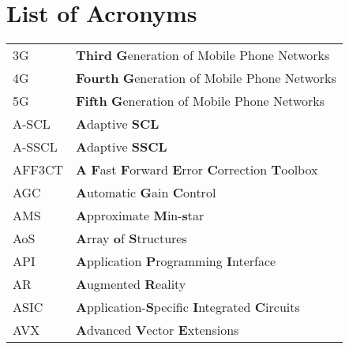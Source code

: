 
\chapter*{List of Acronyms}

\begin{center}
	\begin{longtable}{ p{}  p{} }
		3G      & \textbf{Third} \textbf{G}eneration of Mobile Phone Networks                                                     \\
		4G      & \textbf{Fourth} \textbf{G}eneration of Mobile Phone Networks                                                    \\
		5G      & \textbf{Fifth} \textbf{G}eneration of Mobile Phone Networks                                                     \\
		A-SCL   & \textbf{A}daptive \textbf{SCL}                                                                                  \\
		A-SSCL  & \textbf{A}daptive \textbf{SSCL}                                                                                 \\
		AFF3CT  & \textbf{A} \textbf{F}ast \textbf{F}orward \textbf{E}rror \textbf{C}orrection \textbf{T}oolbox                   \\
		AGC     & \textbf{A}utomatic \textbf{G}ain \textbf{C}ontrol                                                               \\
		AMS     & \textbf{A}pproximate \textbf{M}in-\textbf{s}tar                                                                 \\
		AoS     & \textbf{A}rray \textbf{o}f \textbf{S}tructures                                                                  \\
		API     & \textbf{A}pplication \textbf{P}rogramming \textbf{I}nterface                                                    \\
		AR      & \textbf{A}ugmented \textbf{R}eality                                                                             \\
		ASIC    & \textbf{A}pplication-\textbf{S}pecific \textbf{I}ntegrated \textbf{C}ircuits                                    \\
		AVX     & \textbf{A}dvanced \textbf{V}ector \textbf{E}xtensions                                                           \\

\end{longtable}
\end{center}
